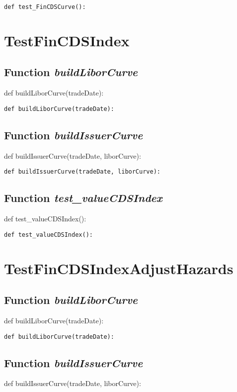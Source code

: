 \documentclass[twoside,11pt]{book}
\begin{document}
\begin{lstlisting}
def test_FinCDSCurve():
\end{lstlisting}


\newpage
\section{TestFinCDSIndex}

\subsection{Function {\it buildLiborCurve}}
def buildLiborCurve(tradeDate):

\begin{lstlisting}
def buildLiborCurve(tradeDate):
\end{lstlisting}

\subsection{Function {\it buildIssuerCurve}}
def buildIssuerCurve(tradeDate, liborCurve):

\begin{lstlisting}
def buildIssuerCurve(tradeDate, liborCurve):
\end{lstlisting}

\subsection{Function {\it test\_valueCDSIndex}}
def test\_valueCDSIndex():

\begin{lstlisting}
def test_valueCDSIndex():
\end{lstlisting}


\newpage
\section{TestFinCDSIndexAdjustHazards}

\subsection{Function {\it buildLiborCurve}}
def buildLiborCurve(tradeDate):

\begin{lstlisting}
def buildLiborCurve(tradeDate):
\end{lstlisting}

\subsection{Function {\it buildIssuerCurve}}
def buildIssuerCurve(tradeDate, liborCurve):
\end{document}

